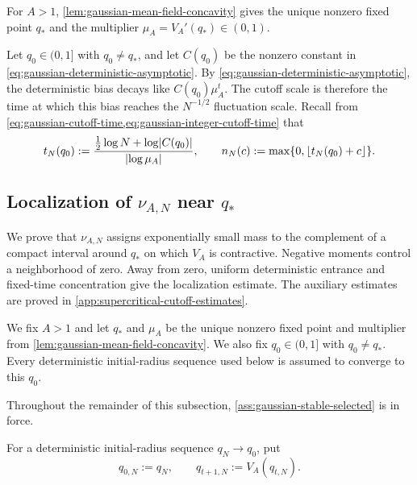 \documentclass[11pt,reqno,a4paper]{article}
\begin{document}
For $A>1$, \cref{lem:gaussian-mean-field-concavity} gives the unique nonzero fixed point
$q_\ast$ and the multiplier $\mu_A=V_A'(q_\ast)\in(0,1)$.

Let $q_0\in(0,1]$ with $q_0\neq q_\ast$, and let $C(q_0)$ be the nonzero
constant in \cref{eq:gaussian-deterministic-asymptotic}.
By \cref{eq:gaussian-deterministic-asymptotic}, the deterministic bias decays
like $C(q_0)\mu_A^t$. The cutoff scale is therefore the time at which this
bias reaches the $N^{-1/2}$ fluctuation scale. Recall from
\cref{eq:gaussian-cutoff-time,eq:gaussian-integer-cutoff-time} that
\begin{equation*}
  t_N(q_0)
  :=
  \frac{\frac12\log N+\log\abs{C(q_0)}}{\abs{\log\mu_A}},
  \qquad
  n_N(c)
  :=
  \max\{0,\lfloor t_N(q_0)+c\rfloor\} .
\end{equation*}

\subsection{Localization of \texorpdfstring{$\nu_{A,N}$}{nu(A,N)} near
\texorpdfstring{$q_\ast$}{q*}}
\label{subsec:gaussian-process-cutoff}

We prove that $\nu_{A,N}$ assigns exponentially small mass to the complement
of a compact interval around $q_\ast$ on which $V_A$ is contractive. Negative
moments control a neighborhood of zero. Away from zero, uniform deterministic
entrance and fixed-time concentration give the localization estimate. The
auxiliary estimates are proved in \cref{app:supercritical-cutoff-estimates}.

\begin{assumption}
\label{ass:gaussian-stable-selected}
  We fix $A>1$ and let $q_\ast$ and $\mu_A$ be the unique nonzero fixed
  point and multiplier from \cref{lem:gaussian-mean-field-concavity}. We also fix
  $q_0\in(0,1]$ with $q_0\neq q_\ast$. Every deterministic initial-radius
  sequence used below is assumed to converge to this $q_0$.
\end{assumption}

Throughout the remainder of this subsection,
\cref{ass:gaussian-stable-selected} is in force.

For a deterministic initial-radius sequence $q_N\to q_0$, put
\begin{equation}\label{eq:gaussian-q-deterministic-orbit}
  q_{0,N}:=q_N,
  \qquad
  q_{t+1,N}:=V_A(q_{t,N}).
\end{equation}
\end{document}
